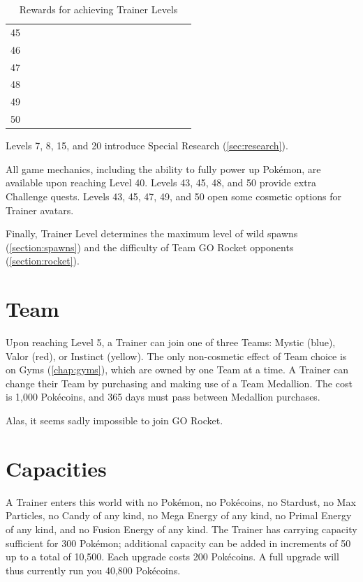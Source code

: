 \begin{table}[t]
\begin{center}
\begin{tabular}{l g c g c g c g c g c g c g c g c g}
   45 &    & & &    &    & & & &   &    &    &    & &   &   &   & \\
   46 &    & & &    &    & & & &   &    &    &    & &   &   &   & \\
   47 &    & & &    &    & & & &   &    &    &    & &   &   &   & \\
   48 &    & & &    &    & & & &   &    &    &    & &   &   &   & \\
   49 &    & & &    &    & & & &   &    &    &    & &   &   &   & \\
   50 &    & & &    &    & & & &   &    &    &    & &   &   &   & \\
\end{tabular}
\caption{Rewards for achieving Trainer Levels}
\label{table:levelitems}
\end{center}
\end{table}
Levels 7, 8, 15, and 20 introduce Special Research (\autoref{sec:research}).

All game mechanics, including the ability to fully power up Pokémon,
 are available upon reaching Level 40.
Levels 43, 45, 48, and 50 provide extra Challenge quests.
Levels 43, 45, 47, 49, and 50 open some cosmetic options for Trainer avatars.

Finally, Trainer Level determines the maximum level of wild spawns
  (\autoref{section:spawns}) and the difficulty of Team GO Rocket
  opponents (\autoref{section:rocket}).

\section{Team}
Upon reaching Level 5, a Trainer can join one of three Teams: Mystic (blue),
  Valor (red), or Instinct (yellow).
The only non-cosmetic effect of Team choice is on Gyms (\autoref{chap:gyms}), which
  are owned by one Team at a time.
A Trainer can change their Team by purchasing and making use of a Team Medallion.
The cost is 1,000 Pokécoins, and 365 days must pass between Medallion purchases.

Alas, it seems sadly impossible to join GO Rocket.

\section{Capacities}
A Trainer enters this world with no Pokémon, no Pokécoins, no Stardust,
  no Max Particles, no Candy of any kind, no Mega Energy of any kind,
  no Primal Energy of any kind, and no Fusion Energy of any kind.
The Trainer has carrying capacity sufficient for 300 Pokémon; additional
  capacity can be added in increments of 50 up to a total of 10,500.
Each upgrade costs 200 Pokécoins.
A full upgrade will thus currently run you 40,800 Pokécoins.

